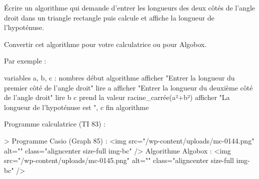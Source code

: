 
%
Écrire un algorithme qui demande d'entrer les longueurs des deux côtés de l'angle droit dans un triangle rectangle puis calcule et affiche la longueur de l'hypoténuse.
\par
Convertir cet algorithme pour votre calculatrice ou pour Algobox.
\begin{corrige}
     Par exemple :
\begin{code}
variables
   a, b, c : nombres
début algorithme
   afficher "Entrer la longueur du premier côté de l'angle droit"
   lire a
   afficher "Entrer la longueur du deuxième côté de l'angle droit"
   lire b
   c prend la valeur racine_carrée(a²+b²)
   afficher "La longueur de l'hypoténuse est ", c
fin algorithme
\end{code}
     Programme calculatrice (TI 83) :
\begin{center}
\end{center}
>
     Programme Casio (Graph 85) :
     <img src="/wp-content/uploads/mc-0144.png" alt="" class="aligncenter size-full  img-bc" />
     Algorithme Algobox :
     <img src="/wp-content/uploads/mc-0145.png" alt="" class="aligncenter size-full  img-bc" />
\end{corrige}
